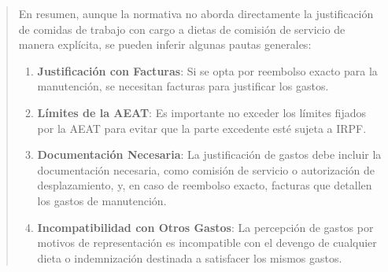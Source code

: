 \documentclass[12pt,a4paper,oneside]{report}
\begin{document}
\begin{itemize}
\begin{itemize}
\begin{quote}
En resumen, aunque la normativa no aborda directamente la justificación de comidas de trabajo con cargo a dietas de comisión de servicio de manera explícita, se pueden inferir algunas pautas generales:

\begin{enumerate}
  \item \textbf{Justificación con Facturas}: Si se opta por reembolso exacto para la manutención, se necesitan facturas para justificar los gastos.
  \item \textbf{Límites de la AEAT}: Es importante no exceder los límites fijados por la AEAT para evitar que la parte excedente esté sujeta a IRPF.
  \item \textbf{Documentación Necesaria}: La justificación de gastos debe incluir la documentación necesaria, como comisión de servicio o autorización de desplazamiento, y, en caso de reembolso exacto, facturas que detallen los gastos de manutención.
  \item \textbf{Incompatibilidad con Otros Gastos}: La percepción de gastos por motivos de representación es incompatible con el devengo de cualquier dieta o indemnización destinada a satisfacer los mismos gastos.
\end{enumerate}


\end{quote}
\end{itemize}
\end{itemize}
\end{document}
